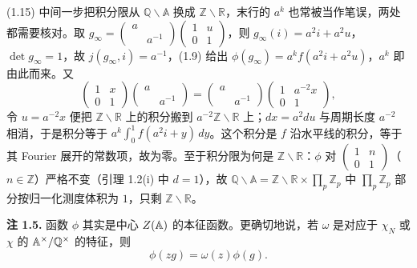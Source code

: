 \begin{annote}
(1.15) 中间一步把积分限从 $\mathbb{Q}\backslash\mathbb{A}$ 换成 $\mathbb{Z}\backslash\mathbb{R}$，末行的 $a^k$ 也常被当作笔误，两处都需要核对。取 $g_\infty=\begin{pmatrix}a&\\&a^{-1}\end{pmatrix}\begin{pmatrix}1&u\\0&1\end{pmatrix}$，则 $g_\infty(i)=a^2i+a^2u$，$\det g_\infty=1$，故 $j(g_\infty,i)=a^{-1}$，(1.9) 给出 $\phi(g_\infty)=a^kf(a^2i+a^2u)$，$a^k$ 即由此而来。又
\[
\begin{pmatrix}1&x\\0&1\end{pmatrix}\begin{pmatrix}a&\\&a^{-1}\end{pmatrix}
=\begin{pmatrix}a&\\&a^{-1}\end{pmatrix}\begin{pmatrix}1&a^{-2}x\\0&1\end{pmatrix},
\]
令 $u=a^{-2}x$ 便把 $\mathbb{Z}\backslash\mathbb{R}$ 上的积分搬到 $a^{-2}\mathbb{Z}\backslash\mathbb{R}$ 上；$dx=a^2du$ 与周期长度 $a^{-2}$ 相消，于是积分等于 $a^k\int_0^1f(a^2i+y)\,dy$。这个积分是 $f$ 沿水平线的积分，等于其 Fourier 展开的常数项，故为零。至于积分限为何是 $\mathbb{Z}\backslash\mathbb{R}$：$\phi$ 对 $\begin{pmatrix}1&n\\0&1\end{pmatrix}$（$n\in\mathbb{Z}$）严格不变（引理 1.2(i) 中 $d=1$），故 $\mathbb{Q}\backslash\mathbb{A}=\mathbb{Z}\backslash\mathbb{R}\times\prod_p\mathbb{Z}_p$ 中 $\prod_p\mathbb{Z}_p$ 部分按归一化测度体积为 $1$，只剩 $\mathbb{Z}\backslash\mathbb{R}$。

\par\vspace{0.15em}{\raggedleft 【来源：由 (1.5)、(1.9) 与引理 1.2 直接算出；原书第 138 页（A）】\par}
\end{annote}

\medskip\noindent\textbf{注 1.5.}\quad
函数 $\phi$ 其实是中心 $Z(\mathbb{A})$ 的本征函数。更确切地说，若 $\omega$ 是对应于 $\chi_N$ 或 $\chi$ 的 $\mathbb{A}^\times/\mathbb{Q}^\times$ 的特征，则
\begin{equation*}\tag{1.16}
\phi(zg)=\omega(z)\phi(g).
\end{equation*}

